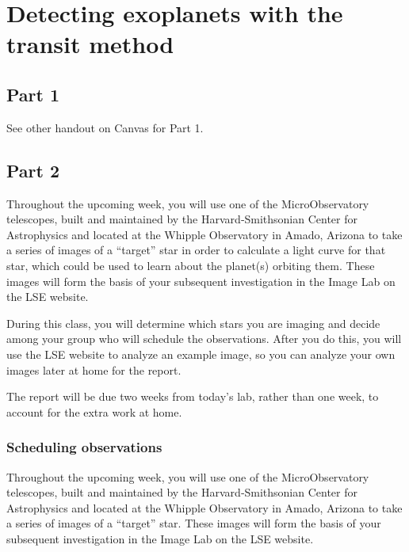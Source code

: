 \chapter{Detecting exoplanets with the transit method}

\section{Part 1}

See other handout on Canvas for Part 1.

\section{Part 2}

Throughout the upcoming week, you will use    one    of    the    MicroObservatory    telescopes,    built    and    maintained    by    the    Harvard‐Smithsonian    Center    for    Astrophysics    and    located    at    the    Whipple    Observatory    in    Amado,    Arizona    to    take    a    series    of    images    of    a    ``target''    star in order to calculate a light curve for that star, which could be used to learn about the planet(s) orbiting them.    These    images    will    form    the    basis    of    your    subsequent    investigation in the Image Lab on the LSE website.

During this class, you will determine which stars you are imaging and decide among your group who will schedule the observations. After you do this, you will use the LSE website to analyze an example image, so you can analyze your own images later at home for the report.

The report will be due two weeks from today's lab, rather than one week, to account for the extra work at home.

\subsection{Scheduling observations}

Throughout the upcoming week, you will use    one    of    the    MicroObservatory    telescopes,    built    and    maintained    by    the    Harvard‐Smithsonian    Center    for    Astrophysics    and    located    at    the    Whipple    Observatory    in    Amado,    Arizona    to    take    a    series    of    images    of    a    ``target''    star.    These    images    will    form    the    basis    of    your    subsequent    investigation in the Image Lab on the LSE website.

